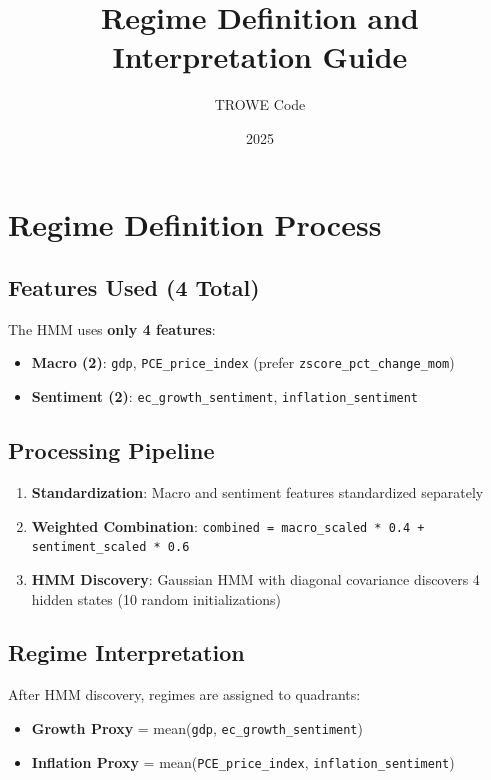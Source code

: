 \documentclass[11pt,a4paper]{article}
\title{Regime Definition and Interpretation Guide}
\author{TROWE Code}
\date{2025}
\begin{document}
\maketitle
\tableofcontents
\newpage

\section{Regime Definition Process}

\subsection{Features Used (4 Total)}

The HMM uses \textbf{only 4 features}:
\begin{itemize}[leftmargin=*]
    \item \textbf{Macro (2)}: \texttt{gdp}, \texttt{PCE\_price\_index} (prefer \texttt{zscore\_pct\_change\_mom})
    \item \textbf{Sentiment (2)}: \texttt{ec\_growth\_sentiment}, \texttt{inflation\_sentiment}
\end{itemize}

\subsection{Processing Pipeline}

\begin{enumerate}[leftmargin=*]
    \item \textbf{Standardization}: Macro and sentiment features standardized separately
    \item \textbf{Weighted Combination}: \texttt{combined = macro\_scaled * 0.4 + sentiment\_scaled * 0.6}
    \item \textbf{HMM Discovery}: Gaussian HMM with diagonal covariance discovers 4 hidden states (10 random initializations)
\end{enumerate}

\subsection{Regime Interpretation}

After HMM discovery, regimes are assigned to quadrants:

\begin{itemize}[leftmargin=*]
    \item \textbf{Growth Proxy} = mean(\texttt{gdp}, \texttt{ec\_growth\_sentiment})
    \item \textbf{Inflation Proxy} = mean(\texttt{PCE\_price\_index}, \texttt{inflation\_sentiment})
\end{itemize}
\end{document}
